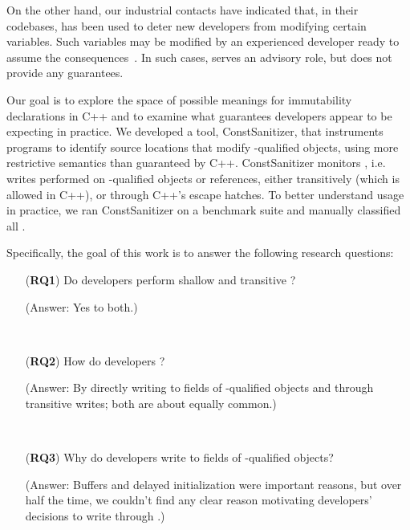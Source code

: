 On the other hand, our industrial contacts have indicated that, in their
codebases, \const{} has been used to deter new developers from modifying certain
variables.
Such variables may be modified by an experienced developer ready to assume the
consequences~\cite{fang:_person}.
In such cases, \const{} serves an advisory role, but does not provide any
guarantees.

Our goal is to explore the space of possible meanings for immutability
declarations in C++ and to examine what guarantees developers appear to be
expecting in practice.
We developed a tool, ConstSanitizer, that instruments programs to identify
source locations that modify \const{}-qualified objects, using more restrictive
semantics than guaranteed by C++.
ConstSanitizer monitors \wstc{}, i.e. writes performed on
\const{}-qualified objects or references, either transitively (which is allowed
in C++), or through C++'s \const{} escape hatches.
To better understand \const{} usage in practice, we ran ConstSanitizer on a
benchmark suite and manually classified all \wstc{}.

Specifically, the goal of this work is to answer the following research
questions:
\vspace*{-0.25em}
\begin{enumerate}
  \item[({\bf RQ1})] Do developers perform shallow and transitive \wstc{}? \\[0.2em]
        \hspace*{1em}
        \begin{minipage}{4.5in} (Answer: Yes to both.) \end{minipage}~\\[-1em]

  \item[({\bf RQ2})] How do developers \wtc{}? \\[0.2em]
        \hspace*{1em}
        \begin{minipage}{4.5in}
          (Answer: By directly writing to fields of \const{}-qualified objects
          and through transitive writes; both are about equally common.)
        \end{minipage}~\\[-0.5em]
  \item[({\bf RQ3})] Why do developers write to fields of \const{}-qualified objects?
        \\[0.2em]
        \hspace*{1em}
        \begin{minipage}{4.5in}
          (Answer: Buffers and delayed initialization were important reasons,
          but over half the time, we couldn't find any clear reason motivating
          developers' decisions to write through \const{}.)
        \end{minipage}~\\[-0.5em]
\end{enumerate}

